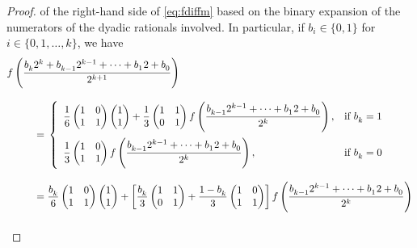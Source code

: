 \documentclass[11pt,a4paper]{amsart}
\theoremstyle{plain}
\theoremstyle{definition}
\numberwithin{equation}{section}
\newcommand{\ts}{\hspace{0.5pt}}
\begin{document}
\begin{proof}
of the right-hand side of \eqref{eq:fdiffm} based on the binary
expansion of the numerators of the dyadic rationals involved. 
In particular, if $b_i\in\{0,1\}$ for $i \in \{0,1,\ldots, k\}$,  we have
\[
\begin{split}
  {f}  & \left( \frac{b^{}_{k} 2^k + b^{}_{k-1} 2^{k-1} +
        \cdots + b^{}_1 \ts 2 + b^{}_0}{2^{k+1}}\right)  \\[3mm]
   & \quad\quad = \, \left\{ \begin{array}{ll}
        \dfrac{1}{6} \left(\begin{matrix}
        1 & 0\\ 1& 1\end{matrix}\right) \left(\begin{matrix} 
        1 \\ 1 \end{matrix}\right)
        + \dfrac{1}{3} \left(\begin{matrix} 
            1 & 1\\ 0& 1\end{matrix}\right)
        {f}\left( \dfrac{b^{}_{k-1} 2^{k-1}+\cdots+b^{}_1 \ts 2 + b^{} _0}
             {2^{k}}\right), & \mbox{if $b^{}_k=1$}  \\[5mm]
    \dfrac{1}{3}\left(\begin{matrix} 1 & 0\\ 1& 1\end{matrix}\right)
    {f}\left(\dfrac{b^{}_{k-1} 2^{k-1} + \cdots + b^{}_1 \ts 2 + b^{}_0}
     {2^{k}}\right), & \mbox{if $b^{}_k=0$} \end{array}\right. \\[3mm]
    &\quad\quad=\dfrac{b^{}_k}{6} \left(\begin{matrix} 
     1 & 0\\ 1& 1\end{matrix}\right)\left(\begin{matrix}
      1 \\ 1 \end{matrix}\right)+\left[\dfrac{b^{}_k}{3}
      \left(\begin{matrix} 1 & 1\\ 0& 1\end{matrix}\right)
      +\dfrac{1-b^{}_k}{3}\left(\begin{matrix} 
       1 & 0\\ 1& 1\end{matrix}\right)\right] {f}
      \left(\dfrac{b^{}_{k-1} 2^{k-1} + \cdots + b^{}_1
        \ts 2 + b^{}_0}{2^{k}}\right)\\[3mm]

\end{split}\]
\end{proof}
\end{document}
